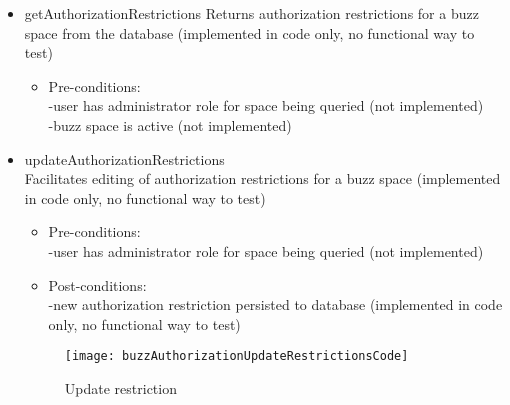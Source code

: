 \begin {itemize}
\begin {itemize}
\begin {itemize}
\item Post-conditions: \\
  -authorization restriction for the user role must be removed from the buzz space (not implemented)
\end{itemize}

\begin{figure}[h!]
  \centering
    \texttt{[image: buzzAuthorizationRemoveRestrictionCode]}
    \caption{Remove restriction}
\end{figure}
 
\item{getAuthorizationRestrictions}
Returns authorization restrictions for a buzz space from the database (implemented in code only, no functional way to test) \\

\begin {itemize}
\item Pre-conditions: \\
-user has administrator role for space being queried (not implemented)\\
        -buzz space is active (not implemented)\\
         
\end{itemize}


\item {updateAuthorizationRestrictions}\\
Facilitates editing of authorization restrictions for a buzz space (implemented in code only, no functional way to test)
\begin {itemize}
\item Pre-conditions: \\
-user has administrator role for space being queried (not implemented)\\
        
\item Post-conditions: \\
  -new authorization restriction persisted to database (implemented in code only, no functional way to test)
\end{itemize}

\begin{figure}[h!]
  \centering
    \texttt{[image: buzzAuthorizationUpdateRestrictionsCode]}
    \caption{Update restriction}
\end{figure}

\end{itemize}

\end{itemize}
